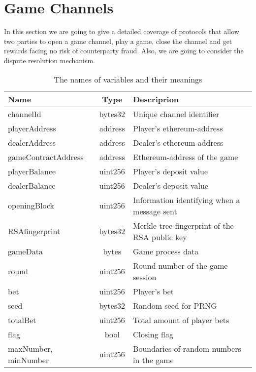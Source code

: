 \section{Game Channels} \label{gamechannel}
In this section we are going to give a detailed coverage of protocols that allow two parties to open a game channel, play a game, close the channel and get rewards facing no risk of counterparty fraud. Also, we are going to consider the dispute resolution mechanism.

\begin{table}[h]

\caption{The names of variables and their meanings}
\begin{tabular}{|l|c|l|}
\hline
Name&Type&Descriprion\\
\hline
channelId & bytes32 & Unique channel identifier\\ 

playerAddress & address & Player's ethereum-address\\            
dealerAddress & address & Dealer's ethereum-address\\  
gameContractAddress & address & Ethereum-address of the game\\             
playerBalance & uint256 & Player's deposit value\\                   
dealerBalance & uint256 & Dealer's deposit value\\                   
openingBlock & uint256 &  Information identifying when a message sent\\                  
RSAfingerprint & bytes32 &  Merkle-tree fingerprint of the RSA public key\\  
gameData & bytes & Game process data\\
round & uint256 & Round number of the game session \\
bet & uint256 & Player's bet \\
seed & bytes32 & Random seed for PRNG\\
totalBet & uint256 & Total amount of  player bets \\
flag & bool &Closing flag \\
maxNumber, minNumber & uint256 & Boundaries of random numbers in the game\\
\hline
\end{tabular}
\end{table}

